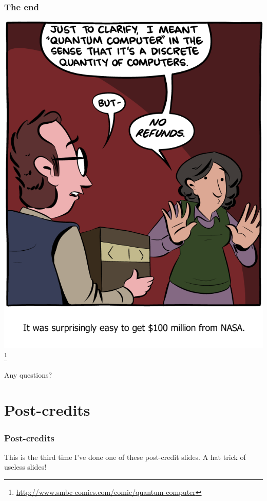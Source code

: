 \documentclass[]{beamer}
\begin{document}
\begin{frame}
\frametitle{The end}
\begin{center}
\includegraphics[scale=0.2]{smbc}\footnote{\url{http://www.smbc-comics.com/comic/quantum-computer}}

Any questions?
\end{center}
\end{frame}

\section{Post-credits}

\begin{frame}[noframenumbering]
\frametitle{Post-credits}
This is the third time I've done one of these post-credit slides. A hat trick of useless slides!
\end{frame}

\end{document}
